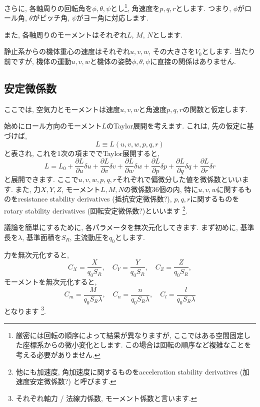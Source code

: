 \documentclass[uplatex,dvipdfmx,a4j,11  pt]{jsarticle}
\begin{document}
さらに, 各軸周りの回転角を$\phi, \theta, \psi$とし\footnote{厳密には回転の順序によって結果が異なりますが, ここではある空間固定した座標系からの微小変化とします. この場合は回転の順序など複雑なことを考える必要がありません.},
角速度を$p, q, r$とします.
つまり, $\phi$がロール角, $\theta$がピッチ角, $\psi$がヨー角に対応します.

また, 各軸周りのモーメントはそれぞれ$L$, $M$, $N$とします.

静止系からの機体重心の速度はそれぞれ$u, v, w$, その大きさを$V_0$とします.
当たり前ですが, 機体の運動$u, v, w$と機体の姿勢$\phi, \theta, \psi$に直接の関係はありません.

\subsection{安定微係数}
ここでは, 空気力とモーメントは速度$u, v, w$と角速度$p, q, r$の関数と仮定します.

始めにロール方向のモーメント$L$のTaylor展開を考えます.
これは, 先の仮定に基づけば,
\begin{equation}
  L \equiv L(u, v, w, p, q, r)
\end{equation}
と表され, これを1次の項まででTaylor展開すると,
\begin{equation}
  L = L_0 + \frac{\partial L}{\partial u}\delta u + \frac{\partial L}{\partial v}\delta v + \frac{\partial L}{\partial w}\delta w + \frac{\partial L}{\partial p}\delta p + \frac{\partial L}{\partial q}\delta q + \frac{\partial L}{\partial r}\delta r
\end{equation}
と展開できます. 
ここで$u, v, w, p, q, r$それぞれで偏微分した値を微係数といいます.
また, 力$X, Y, Z$, モーメント$L, M, N$の微係数36個の内, 
特に$u, v, w$に関するものをresistance stability derivatives (抵抗安定微係数?), 
$p, q, r$に関するものをrotary stability derivatives (回転安定微係数?)といいます
\footnote{他にも加速度, 角加速度に関するものをacceleration stability derivatives (加速度安定微係数?) と呼びます.}.

\enskip

議論を簡単にするために, 各パラメータを無次元化してきます.
まず初めに, 基準長を$\lambda$, 基準面積を$S_{R}$, 主流動圧を$q_0$とします.

力を無次元化すると,
\begin{equation}
  C_X = \frac{X}{q_0S_R}, \quad
  C_Y = \frac{Y}{q_0S_R},  \quad
  C_Z = \frac{Z}{q_0S_R}, \label{force_nondimentional}
\end{equation}
モーメントを無次元化すると,
\begin{equation}
  C_m = \frac{M}{q_0S_R\lambda}, \quad
  C_n = \frac{n}{q_0S_R\lambda}, \quad
  C_l = \frac{l}{q_0S_R\lambda}
\end{equation}
となります
\footnote{それぞれ軸力 / 法線力係数, モーメント係数と言います.}.
\end{document}
